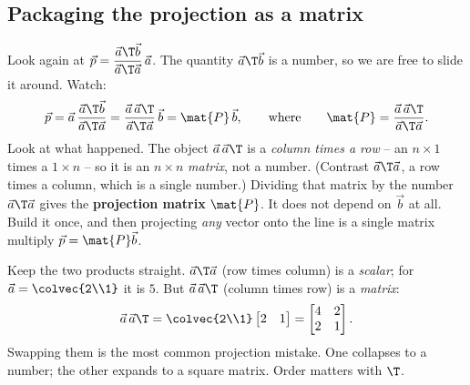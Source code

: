 \subsection{Packaging the projection as a matrix}

Look again at $\vec{p} = \dfrac{\vec{a}\T\vec{b}}{\vec{a}\T\vec{a}}\,\vec{a}$. The quantity
$\vec{a}\T\vec{b}$ is a number, so we are free to slide it around. Watch:
\[
  \vec{p} = \vec{a}\,\frac{\vec{a}\T\vec{b}}{\vec{a}\T\vec{a}}
          = \frac{\vec{a}\,\vec{a}\T}{\vec{a}\T\vec{a}}\,\vec{b}
          = \mat{P}\,\vec{b},
  \qquad\text{where}\qquad
  \mat{P} = \frac{\vec{a}\,\vec{a}\T}{\vec{a}\T\vec{a}}.
\]
Look at what happened. The object $\vec{a}\,\vec{a}\T$ is a \emph{column times a row} -- an
$n\times1$ times a $1\times n$ -- so it is an $n\times n$ \emph{matrix}, not a number. (Contrast
$\vec{a}\T\vec{a}$, a row times a column, which is a single number.) Dividing that matrix by the
number $\vec{a}\T\vec{a}$ gives the \textbf{projection matrix} $\mat{P}$. It does not depend on
$\vec{b}$ at all. Build it once, and then projecting \emph{any} vector onto the line is a single
matrix multiply $\vec{p}=\mat{P}\vec{b}$.

\begin{trapbox}
Keep the two products straight. $\vec{a}\T\vec{a}$ (row times column) is a \emph{scalar}; for
$\vec{a}=\colvec{2\\1}$ it is $5$. But $\vec{a}\,\vec{a}\T$ (column times row) is a \emph{matrix}:
\[
  \vec{a}\,\vec{a}\T = \colvec{2\\1}\begin{bmatrix}2 & 1\end{bmatrix}
  = \begin{bmatrix} 4 & 2 \\ 2 & 1\end{bmatrix}.
\]
Swapping them is the most common projection mistake. One collapses to a number; the other expands
to a square matrix. Order matters with $\T$.
\end{trapbox}

